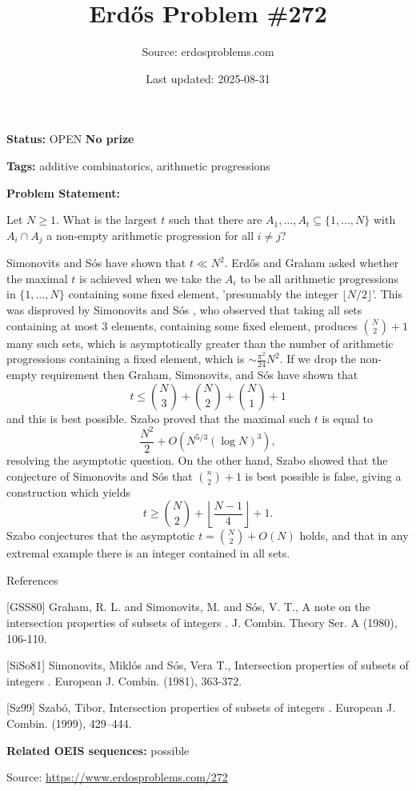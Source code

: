 \documentclass{article}
\title{Erd\H{o}s Problem \#272}
\date{Last updated: 2025-08-31}
\author{Source: erdosproblems.com}
\begin{document}
\maketitle

\noindent\textbf{Status:} OPEN \quad \textbf{No prize}

\noindent\textbf{Tags:} additive combinatorics, arithmetic progressions

\medskip

\noindent\textbf{Problem Statement:}

Let $N\geq 1$. What is the largest $t$ such that there are $A_1,\ldots,A_t\subseteq \{1,\ldots,N\}$ with $A_i\cap A_j$ a non-empty arithmetic progression for all $i\neq j$?




Simonovits and S\'{o}s \cite{SiSo81} have shown that $t\ll N^2$. Erd\H{o}s and Graham asked whether the maximal $t$ is achieved when we take the $A_i$ to be all arithmetic progressions in $\{1,\ldots,N\}$ containing some fixed element, 'presumably the integer $\lfloor N/2\rfloor$'. This was disproved by Simonovits and S\'{o}s \cite{SiSo81}, who observed that taking all sets containing at most $3$ elements, containing some fixed element, produces $\binom{N}{2}+1$ many such sets, which is asymptotically greater than the number of arithmetic progressions containing a fixed element, which is $\sim \frac{\pi^2}{24}N^2$. If we drop the non-empty requirement then Graham, Simonovits, and S\'{o}s \cite{GSS80} have shown that\[t\leq \binom{N}{3}+\binom{N}{2}+\binom{N}{1}+1\]and this is best possible. Szabo \cite{Sz99} proved that the maximal such $t$ is equal to\[\frac{N^2}{2}+O(N^{5/3}(\log N)^3),\]resolving the asymptotic question. On the other hand, Szabo showed that the conjecture of Simonovits and S\'{o}s that $\binom{n}{2}+1$ is best possible is false, giving a construction which yields\[t \geq \binom{N}{2}+\left\lfloor\frac{N-1}{4}\right\rfloor+1.\]Szabo conjectures that the asymptotic $t=\binom{N}{2}+O(N)$ holds, and that in any extremal example there is an integer contained in all sets.




References

[GSS80] Graham, R. L. and Simonovits, M. and S\'{o}s, V. T., A note on the intersection properties of subsets of integers . J. Combin. Theory Ser. A (1980), 106-110.

[SiSo81] Simonovits, Mikl\'{o}s and S\'{o}s, Vera T., Intersection properties of subsets of integers . European J. Combin. (1981), 363-372.

[Sz99] Szab\'o, Tibor, Intersection properties of subsets of integers . European J. Combin. (1999), 429--444.

\noindent\textbf{Related OEIS sequences:} possible


\bigskip
\noindent\small{Source: \url{https://www.erdosproblems.com/272}}
\end{document}
